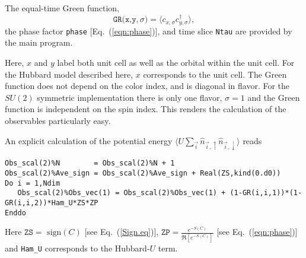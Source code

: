 The equal-time  Green function,
\begin{equation}
	 \texttt{GR(x,y},\sigma{\texttt)}  = \langle c^{\phantom{\dagger}}_{x,\sigma} c^{\dagger}_{y,\sigma}  \rangle,
\end{equation}
the  phase factor \texttt{phase} [Eq.~(\ref{eqn:phase})], and time slice \texttt{Ntau}   are provided by the main program.  

Here,   $x$ and $y$ label  both unit cell as well as the orbital within the unit cell. For the Hubbard model described here, $x$ corresponds to the unit cell.  The Green function  does not depend on the color index, and is diagonal in flavor.  For the $SU(2)$ symmetric implementation  there is only one flavor, $\sigma = 1$ and the Green function is  independent on the spin index.  This renders the calculation of the observables particularly easy.   

An explicit calculation of the   potential energy  $ \langle U \sum_{\vec{i}}  \hat{n}_{\vec{i},\uparrow}   \hat{n}_{\vec{i},\downarrow}  \rangle $ reads 
\begin{lstlisting}[style=fortran]
Obs_scal(2)%N        = Obs_scal(2)%N + 1
Obs_scal(2)%Ave_sign = Obs_scal(2)%Ave_sign + Real(ZS,kind(0.d0))
Do i = 1,Ndim
   Obs_scal(2)%Obs_vec(1) = Obs_scal(2)%Obs_vec(1) + (1-GR(i,i,1))*(1-GR(i,i,2))*Ham_U*ZS*ZP
Enddo
\end{lstlisting} 
Here  $ \texttt{ZS} = \text{ sign} (C) $  [see Eq.~(\ref{Sign.eq})],  $ \texttt{ZP} =   \frac{e^{-S(C)}} {\Re \left[e^{-S(C)} \right]}   $ [see Eq.~(\ref{eqn:phase})] and  \texttt{Ham\_U}  corresponds to the Hubbard-$U$ term.

